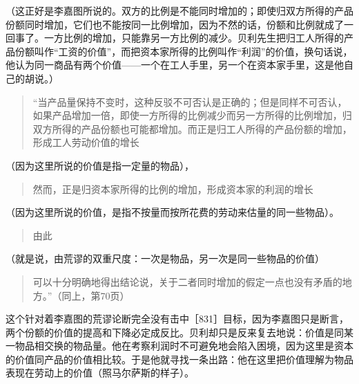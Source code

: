 （这正好是李嘉图所说的。双方的比例是不能同时增加的；即使归双方所得的产品份额同时增加，它们也不能按同一比例增加，因为不然的话，份额和比例就成了一回事了。一方比例的增加，只能靠另一方比例的减少。贝利先生把归工人所得的产品份额叫作“工资的价值”，而把资本家所得的比例叫作“利润”的价值，换句话说，他认为同一商品有两个价值——一个在工人手里，另一个在资本家手里，这是他自己的胡说。）

\begin{quote}{“当产品量保持不变时，这种反驳不可否认是正确的；但是同样不可否认，如果产品增加一倍，即使一方所得的比例减少而另一方所得的比例增加，归双方所得的产品份额也可能都增加。而正是归工人所得的产品份额的增加，形成工人劳动价值的增长}\end{quote}

（因为这里所说的价值是指一定量的物品），

\begin{quote}{然而，正是归资本家所得的比例的增加，形成资本家的利润的增长}\end{quote}

（因为这里所说的价值，是指不按量而按所花费的劳动来估量的同一些物品）。

\begin{quote}{由此}\end{quote}

（就是说，由荒谬的双重尺度：一次是物品，另一次是同一些物品的价值）

\begin{quote}{可以十分明确地得出结论说，关于二者同时增加的假定一点也没有矛盾的地方。”（同上，第70页）}\end{quote}

这个针对着李嘉图的荒谬论断完全没有击中［831］目标，因为李嘉图只是断言，两个份额的价值的提高和下降必定成反比。贝利却只是反来复去地说：价值是同某一物品相交换的物品量。他在考察利润时不可避免地会陷入困境，因为这里是资本的价值同产品的价值相比较。于是他就寻找一条出路：他在这里把价值理解为物品表现在劳动上的价值（照马尔萨斯的样子）。


